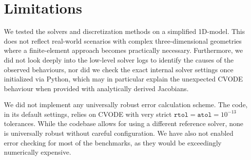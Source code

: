 \section{Limitations}
We tested the solvers and discretization methods on a simplified 1D-model. This does not reflect real-world scenarios with complex three-dimensional geometries where a finite-element approach becomes practically necessary. Furthermore, we did not look deeply into the low-level solver logs to identify the causes of the observed behaviours, nor did we check the exact internal solver settings once initialized via Python, which may in particular explain the unexpected CVODE behaviour when provided with analytically derived Jacobians.

We did not implement any universally robust error calculation scheme. The code, in its default settings, relies on CVODE with very strict \(\texttt{rtol} = \texttt{atol} = 10^{-13}\) tolerances. While the codebase allows for using a different reference solver, none is universally robust without careful configuration. We have also not enabled error checking for most of the benchmarks, as they would be exceedingly numerically expensive. 
